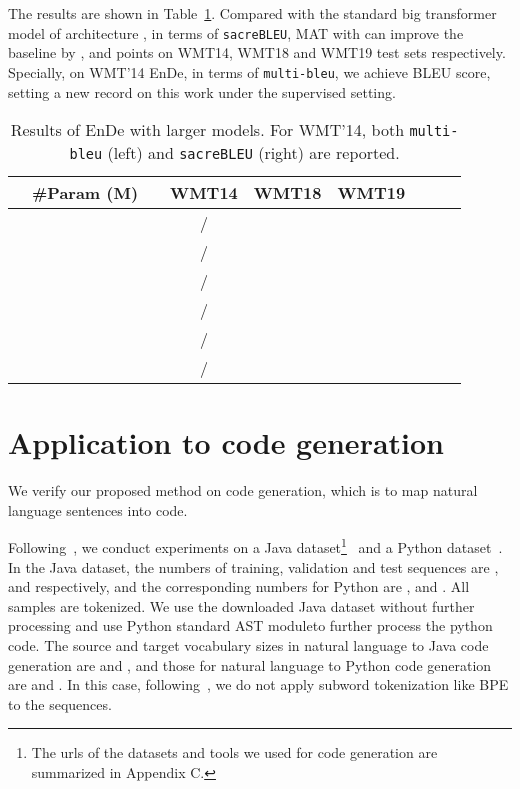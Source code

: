 \documentclass{article}
\begin{document}
The results are shown in Table~\ref{tab:wmt19_en2de}. Compared with the standard big transformer model of architecture , in terms of \texttt{sacreBLEU}, MAT with  can improve the baseline by ,  and  points on WMT14, WMT18 and WMT19 test sets respectively. Specially, on WMT'14 EnDe, in terms of \texttt{multi-bleu}, we achieve  BLEU score, setting a new record on this work under the supervised setting.

\begin{table}[!htbp]
\vspace{-2mm}
\centering
\caption{Results of EnDe with larger models. For WMT'14, both \texttt{multi-bleu} (left) and \texttt{sacreBLEU} (right) are reported.}
\begin{tabular}{lcccccccc}
\toprule
 & \#Param (M) &  & WMT14  & WMT18 & WMT19  \\
\midrule
 &   &  &  /  &  &  \\
 &   &  &  /  &  &  \\
\midrule
 &   &  &  /  &  &  \\
 &   &  &  /  &  &  \\
 &   &  &  /  &  &  \\
 &   &  &  /  &  &  \\
\bottomrule
\end{tabular}
\label{tab:wmt19_en2de}
\vspace{-2mm}
\end{table}


\section{Application to code generation}
We verify our proposed method on code generation, which is to map natural language sentences into code.


 Following~\cite{wei2019code}, we conduct experiments on a Java dataset\footnote{The urls of the datasets and tools we used for code generation are summarized in Appendix C.\label{foot:codegen_script}}~\cite{ijcai2018-314} and a Python dataset~\cite{wan2018improving}. In the Java dataset, the numbers of training, validation and test sequences are ,  and  respectively, and the corresponding numbers for Python are ,  and . All samples are tokenized. We use the downloaded Java dataset without further processing and use Python standard AST moduleto further process the python code. The source and target vocabulary sizes in natural language to Java code generation are  and , and those for natural language to Python code generation are  and . In this case, following~\cite{wei2019code}, we do not apply subword tokenization like BPE to the sequences.
\end{document}
